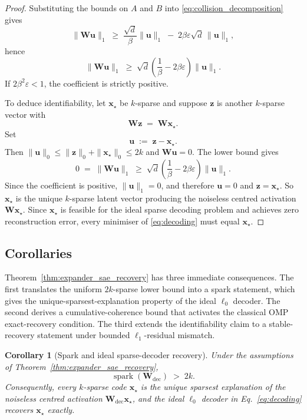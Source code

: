 \documentclass{article}
\theoremstyle{plain}
\newtheorem{corollary}[theorem]{Corollary}
\theoremstyle{definition}
\theoremstyle{remark}
\begin{document}
\begin{proof}
Substituting the bounds on $A$ and $B$ into \eqref{eq:collision_decomposition} gives
\[
    \|\mathbf{W}\mathbf{u}\|_1
    \;\ge\;
    \frac{\sqrt{d}}{\beta}\|\mathbf{u}\|_1
    \;-\;
    2\beta\varepsilon\sqrt{d}\,\|\mathbf{u}\|_1,
\]
hence
\[
    \|\mathbf{W}\mathbf{u}\|_1
    \;\ge\;
    \sqrt{d}
    \left(
        \frac{1}{\beta} - 2\beta\varepsilon
    \right)
    \|\mathbf{u}\|_1.
\]
If $2\beta^2\varepsilon < 1$, the coefficient is strictly positive.

To deduce identifiability, let $\mathbf{x}_\star$ be $k$-sparse and suppose $\mathbf{z}$ is another $k$-sparse vector with
\[
    \mathbf{W}\mathbf{z} \;=\; \mathbf{W}\mathbf{x}_\star.
\]
Set
\[
    \mathbf{u} \;:=\; \mathbf{z} - \mathbf{x}_\star.
\]
Then $\|\mathbf{u}\|_0 \le \|\mathbf{z}\|_0 + \|\mathbf{x}_\star\|_0 \le 2k$ and $\mathbf{W}\mathbf{u} = 0$. The lower bound gives
\[
    0
    \;=\;
    \|\mathbf{W}\mathbf{u}\|_1
    \;\ge\;
    \sqrt{d}
    \left(
        \frac{1}{\beta} - 2\beta\varepsilon
    \right)
    \|\mathbf{u}\|_1.
\]
Since the coefficient is positive, $\|\mathbf{u}\|_1 = 0$, and therefore $\mathbf{u} = 0$ and $\mathbf{z} = \mathbf{x}_\star$. So $\mathbf{x}_\star$ is the unique $k$-sparse latent vector producing the noiseless centred activation $\mathbf{W}\mathbf{x}_\star$. Since $\mathbf{x}_\star$ is feasible for the ideal sparse decoding problem and achieves zero reconstruction error, every minimiser of \eqref{eq:decoding} must equal $\mathbf{x}_\star$.
\end{proof}



\subsection{Corollaries}
\label{app:theory_corollaries}

Theorem~\ref{thm:expander_sae_recovery} has three immediate consequences. The first translates the uniform $2k$-sparse lower bound into a spark statement, which gives the unique-sparsest-explanation property of the ideal $\ell_0$ decoder. The second derives a cumulative-coherence bound that activates the classical OMP exact-recovery condition. The third extends the identifiability claim to a stable-recovery statement under bounded $\ell_1$-residual mismatch.

\begin{corollary}[Spark and ideal sparse-decoder recovery]
\label{cor:spark_identifiability}
Under the assumptions of Theorem~\ref{thm:expander_sae_recovery},
\[
    \operatorname{spark}(\mathbf{W}_{\mathrm{dec}}) \;>\; 2k.
\]
Consequently, every $k$-sparse code $\mathbf{x}_\star$ is the unique sparsest explanation of the noiseless centred activation $\mathbf{W}_{\mathrm{dec}}\mathbf{x}_\star$, and the ideal $\ell_0$ decoder in Eq.~\eqref{eq:decoding} recovers $\mathbf{x}_\star$ exactly.
\end{corollary}
\end{document}
